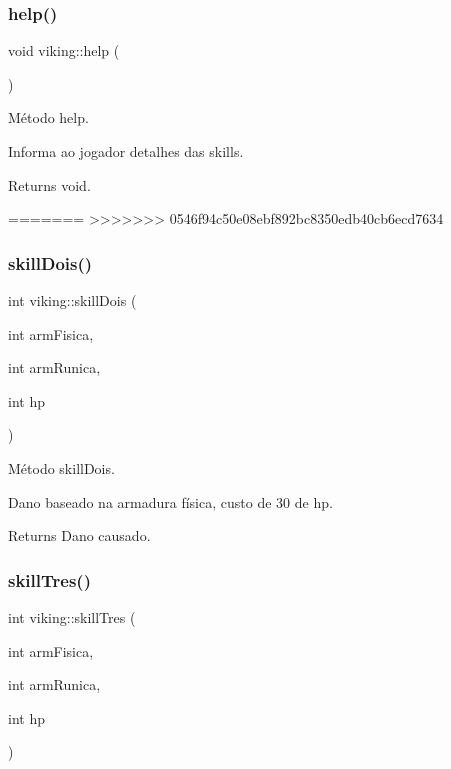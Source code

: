 \subsubsection{\texorpdfstring{help()}{help()}}
{\footnotesize\ttfamily void viking\+::help (\begin{DoxyParamCaption}{ }\end{DoxyParamCaption})}



Método help. 

Informa ao jogador detalhes das skills. \begin{DoxyReturn}{Returns}
void. 
\end{DoxyReturn}
=======
>>>>>>> 0546f94c50e08ebf892bc8350edb40cb6ecd7634
\mbox{\label{classviking_a5d9d645dae5e647b668c57afa0be1cd8}} 
\subsubsection{\texorpdfstring{skill\+Dois()}{skillDois()}}
{\footnotesize\ttfamily int viking\+::skill\+Dois (\begin{DoxyParamCaption}\item[{int}]{arm\+Fisica,  }\item[{int}]{arm\+Runica,  }\item[{int}]{hp }\end{DoxyParamCaption})}



Método skill\+Dois. 

Dano baseado na armadura física, custo de 30 de hp. \begin{DoxyReturn}{Returns}
Dano causado. 
\end{DoxyReturn}
\mbox{\label{classviking_a68c634c68c727ebd2638965b6d393f42}} 
\subsubsection{\texorpdfstring{skill\+Tres()}{skillTres()}}
{\footnotesize\ttfamily int viking\+::skill\+Tres (\begin{DoxyParamCaption}\item[{int}]{arm\+Fisica,  }\item[{int}]{arm\+Runica,  }\item[{int}]{hp }\end{DoxyParamCaption})}



